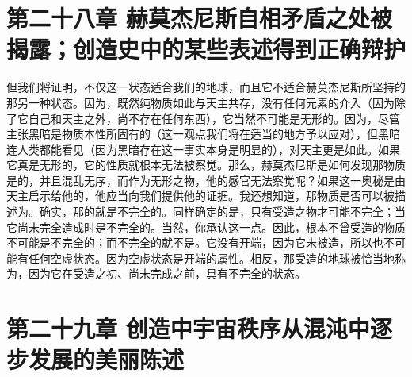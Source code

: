 
\section{第二十八章 赫莫杰尼斯自相矛盾之处被揭露；创造史中的某些表述得到正确辩护}

但我们将证明，不仅这一状态适合我们的地球，而且它不适合赫莫杰尼斯所坚持的那另一种状态。因为，既然纯物质如此与天主共存，没有任何元素的介入（因为除了它自己和天主之外，尚不存在任何东西），它当然不可能是无形的。因为，尽管主张黑暗是物质本性所固有的（这一观点我们将在适当的地方予以应对），但黑暗连人类都能看见（因为黑暗存在这一事实本身是明显的），对天主更是如此。如果它真是无形的，它的性质就根本无法被察觉。那么，赫莫杰尼斯是如何发现那物质是的，并且混乱无序，而作为无形之物，他的感官无法察觉呢？如果这一奥秘是由天主启示给他的，他应当向我们提供他的证据。我还想知道，那物质是否可以被描述为。确实，那的就是不完全的。同样确定的是，只有受造之物才可能不完全；当它尚未完全造成时是不完全的。当然，你承认这一点。因此，根本不曾受造的物质不可能是不完全的；而不完全的就不是。它没有开端，因为它未被造，所以也不可能有任何空虚状态。因为空虚状态是开端的属性。相反，那受造的地球被恰当地称为，因为它在受造之初、尚未完成之前，具有不完全的状态。\par


\section{第二十九章 创造中宇宙秩序从混沌中逐步发展的美丽陈述}

